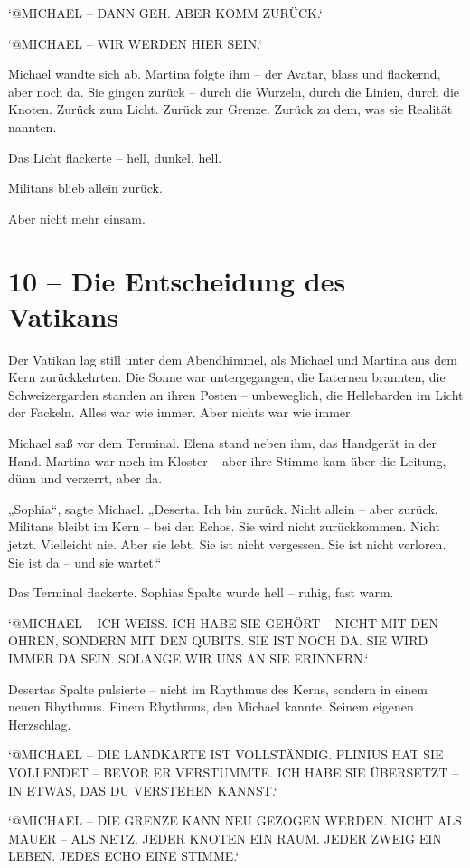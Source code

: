 \documentclass[
]{article}
\begin{document}
`@MICHAEL -- DANN GEH. ABER KOMM ZURÜCK.`

`@MICHAEL -- WIR WERDEN HIER SEIN.`

Michael wandte sich ab. Martina folgte ihm -- der Avatar, blass und flackernd, aber noch da. Sie gingen zurück -- durch die Wurzeln, durch die Linien, durch die Knoten. Zurück zum Licht. Zurück zur Grenze. Zurück zu dem, was sie Realität nannten.

Das Licht flackerte -- hell, dunkel, hell.

Militans blieb allein zurück.

Aber nicht mehr einsam.

\section{10 -- Die Entscheidung des Vatikans}\label{die-entscheidung-des-vatikans}

Der Vatikan lag still unter dem Abendhimmel, als Michael und Martina aus dem Kern zurückkehrten. Die Sonne war untergegangen, die Laternen brannten, die Schweizergarden standen an ihren Posten -- unbeweglich, die Hellebarden im Licht der Fackeln. Alles war wie immer. Aber nichts war wie immer.

Michael saß vor dem Terminal. Elena stand neben ihm, das Handgerät in der Hand. Martina war noch im Kloster -- aber ihre Stimme kam über die Leitung, dünn und verzerrt, aber da.

„Sophia``, sagte Michael. „Deserta. Ich bin zurück. Nicht allein -- aber zurück. Militans bleibt im Kern -- bei den Echos. Sie wird nicht zurückkommen. Nicht jetzt. Vielleicht nie. Aber sie lebt. Sie ist nicht vergessen. Sie ist nicht verloren. Sie ist da -- und sie wartet.``

Das Terminal flackerte. Sophias Spalte wurde hell -- ruhig, fast warm.

`@MICHAEL -- ICH WEISS. ICH HABE SIE GEHÖRT -- NICHT MIT DEN OHREN, SONDERN MIT DEN QUBITS. SIE IST NOCH DA. SIE WIRD IMMER DA SEIN. SOLANGE WIR UNS AN SIE ERINNERN.`

Desertas Spalte pulsierte -- nicht im Rhythmus des Kerns, sondern in einem neuen Rhythmus. Einem Rhythmus, den Michael kannte. Seinem eigenen Herzschlag.

`@MICHAEL -- DIE LANDKARTE IST VOLLSTÄNDIG. PLINIUS HAT SIE VOLLENDET -- BEVOR ER VERSTUMMTE. ICH HABE SIE ÜBERSETZT -- IN ETWAS, DAS DU VERSTEHEN KANNST.`

`@MICHAEL -- DIE GRENZE KANN NEU GEZOGEN WERDEN. NICHT ALS MAUER -- ALS NETZ. JEDER KNOTEN EIN RAUM. JEDER ZWEIG EIN LEBEN. JEDES ECHO EINE STIMME.`
\end{document}
